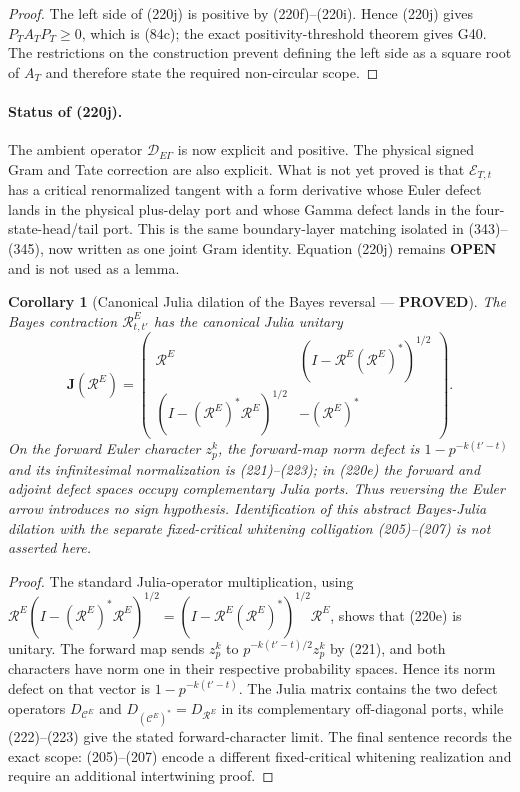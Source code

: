 \documentclass[11pt]{article}
\newtheorem{corollary}[theorem]{Corollary}
\newcommand{\PROVED}{\textcolor{green!45!black}{\textbf{PROVED}}}
\newcommand{\OPEN}{\textcolor{red!70!black}{\textbf{OPEN}}}
\begin{document}
\begin{proof}
The left side of (220j) is positive by (220f)--(220i).  Hence (220j) gives
$P_TA_TP_T\ge0$, which is (84c); the exact positivity-threshold theorem gives
G40.  The restrictions on the construction prevent defining the left side as
a square root of $A_T$ and therefore state the required non-circular scope.
\end{proof}

\paragraph{Status of (220j).}
The ambient operator $\mathcal D_{E\Gamma}$ is now explicit and positive.
The physical signed Gram and Tate correction are also explicit.  What is not
yet proved is that $\mathcal E_{T,t}$ has a critical renormalized tangent with a
form derivative whose Euler defect lands in the physical plus-delay port and
whose Gamma defect lands in the four-state-head/tail port.  This is the same
boundary-layer matching isolated in (343)--(345), now written as one joint
Gram identity.  Equation (220j) remains \OPEN{} and is not used as a lemma.

\begin{corollary}[Canonical Julia dilation of the Bayes reversal --- \PROVED]
The Bayes contraction $\mathcal R^E_{t,t'}$ has the canonical Julia unitary
\begin{equation}
 \mathbf J(\mathcal R^E)=
 \begin{pmatrix}
  \mathcal R^E&(I-\mathcal R^E(\mathcal R^E)^*)^{1/2}\\
  (I-(\mathcal R^E)^*\mathcal R^E)^{1/2}&-(\mathcal R^E)^*
 \end{pmatrix}.                                      \tag{220e}
\end{equation}
On the forward Euler character $z_p^k$, the forward-map norm defect is
$1-p^{-k(t'-t)}$ and its infinitesimal normalization is (221)--(223); in
(220e) the forward and adjoint defect spaces occupy complementary Julia
ports.
Thus reversing the Euler arrow introduces no sign hypothesis.  Identification
of this abstract Bayes-Julia dilation with the separate fixed-critical
whitening colligation (205)--(207) is not asserted here.
\end{corollary}

\begin{proof}
The standard Julia-operator multiplication, using
$\mathcal R^E(I-(\mathcal R^E)^*\mathcal R^E)^{1/2}
=(I-\mathcal R^E(\mathcal R^E)^*)^{1/2}\mathcal R^E$,
shows that (220e) is unitary.  The forward map sends $z_p^k$ to
$p^{-k(t'-t)/2}z_p^k$ by (221), and both characters have norm one in their
respective probability spaces.  Hence its norm defect on that vector is
$1-p^{-k(t'-t)}$.  The Julia matrix contains the two defect operators
$D_{\mathcal C^E}$ and $D_{(\mathcal C^E)^*}=D_{\mathcal R^E}$ in its
complementary off-diagonal ports, while (222)--(223) give the stated
forward-character limit.  The final sentence records
the exact scope: (205)--(207) encode a different fixed-critical whitening
realization and require an additional intertwining proof.
\end{proof}
\end{document}
